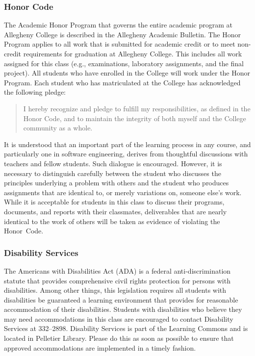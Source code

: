 \documentclass[11pt]{article}
\begin{document}
\subsubsection*{Honor Code}

The Academic Honor Program that governs the entire academic program at Allegheny
College is described in the Allegheny Academic Bulletin. The Honor Program
applies to all work that is submitted for academic credit or to meet non-credit
requirements for graduation at Allegheny College. This includes all work
assigned for this class (e.g., examinations, laboratory assignments, and the
final project). All students who have enrolled in the College will work under
the Honor Program. Each student who has matriculated at the College has
acknowledged the following pledge:

\vspace*{-.10in}
%
\begin{quote}
%
  I hereby recognize and pledge to fulfill my responsibilities, as defined in
  the Honor Code, and to maintain the integrity of both myself and the College
  community as a whole.
%
\end{quote}
%
\vspace*{-.10in}

\noindent It is understood that an important part of the learning process in any
course, and particularly one in software engineering, derives from thoughtful
discussions with teachers and fellow students. Such dialogue is encouraged.
However, it is necessary to distinguish carefully between the student who
discusses the principles underlying a problem with others and the student who
produces assignments that are identical to, or merely variations on, someone
else's work. While it is acceptable for students in this class to discuss their
programs, documents, and reports with their classmates, deliverables that are
nearly identical to the work of others will be taken as evidence of violating
the \mbox{Honor Code}.

\subsubsection*{Disability Services}

The Americans with Disabilities Act (ADA) is a federal anti-discrimination
statute that provides comprehensive civil rights protection for persons with
disabilities. Among other things, this legislation requires all students with
disabilities be guaranteed a learning environment that provides for reasonable
accommodation of their disabilities. Students with disabilities who believe they
may need accommodations in this class are encouraged to contact Disability
Services at 332--2898. Disability Services is part of the Learning Commons and
is located in Pelletier Library. Please do this as soon as possible to ensure
that approved accommodations are implemented in a timely fashion.
\end{document}
